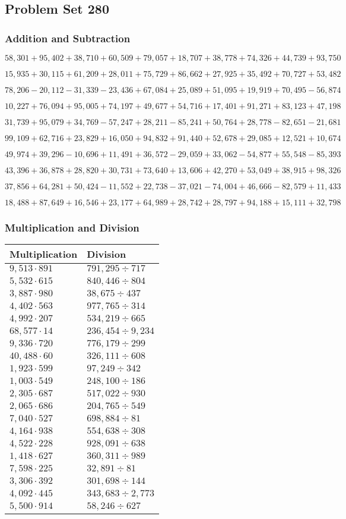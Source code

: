 \hypertarget{problem-set-280}{%
\subsection{Problem Set 280}\label{problem-set-280}}

\hypertarget{addition-and-subtraction}{%
\subsubsection{Addition and
Subtraction}\label{addition-and-subtraction}}

\(58,301+95,402+38,710+60,509+79,057+18,707+38,778+74,326+44,739+93,750\)

\(15,935+30,115+61,209+28,011+75,729+86,662+27,925+35,492+70,727+53,482\)

\(78,206-20,112-31,339-23,436+67,084+25,089+51,095+19,919+70,495-56,874\)

\(10,227+76,094+95,005+74,197+49,677+54,716+17,401+91,271+83,123+47,198\)

\(31,739+95,079+34,769-57,247+28,211-85,241+50,764+28,778-82,651-21,681\)

\(99,109+62,716+23,829+16,050+94,832+91,440+52,678+29,085+12,521+10,674\)

\(49,974+39,296-10,696+11,491+36,572-29,059+33,062-54,877+55,548-85,393\)

\(43,396+36,878+28,820+30,731+73,640+13,606+42,270+53,049+38,915+98,326\)

\(37,856+64,281+50,424-11,552+22,738-37,021-74,004+46,666-82,579+11,433\)

\(18,488+87,649+16,546+23,177+64,989+28,742+28,797+94,188+15,111+32,798\)

\hypertarget{multiplication-and-division}{%
\subsubsection{Multiplication and
Division}\label{multiplication-and-division}}

\begin{longtable}[]{@{}ll@{}}
\toprule
Multiplication & Division\tabularnewline
\midrule
\endhead
\(9,513\cdot891\) & \(791,295÷717\)\tabularnewline
\(5,532\cdot615\) & \(840,446÷804\)\tabularnewline
\(3,887\cdot980\) & \(38,675÷437\)\tabularnewline
\(4,402\cdot563\) & \(977,765÷314\)\tabularnewline
\(4,992\cdot207\) & \(534,219÷665\)\tabularnewline
\(68,577\cdot14\) & \(236,454÷9,234\)\tabularnewline
\(9,336\cdot720\) & \(776,179÷299\)\tabularnewline
\(40,488\cdot60\) & \(326,111÷608\)\tabularnewline
\(1,923\cdot599\) & \(97,249÷342\)\tabularnewline
\(1,003\cdot549\) & \(248,100÷186\)\tabularnewline
\(2,305\cdot687\) & \(517,022÷930\)\tabularnewline
\(2,065\cdot686\) & \(204,765÷549\)\tabularnewline
\(7,040\cdot527\) & \(698,884÷81\)\tabularnewline
\(4,164\cdot938\) & \(554,638÷308\)\tabularnewline
\(4,522\cdot228\) & \(928,091÷638\)\tabularnewline
\(1,418\cdot627\) & \(360,311÷989\)\tabularnewline
\(7,598\cdot225\) & \(32,891÷81\)\tabularnewline
\(3,306\cdot392\) & \(301,698÷144\)\tabularnewline
\(4,092\cdot445\) & \(343,683÷2,773\)\tabularnewline
\(5,500\cdot914\) & \(58,246÷627\)\tabularnewline
\bottomrule
\end{longtable}
